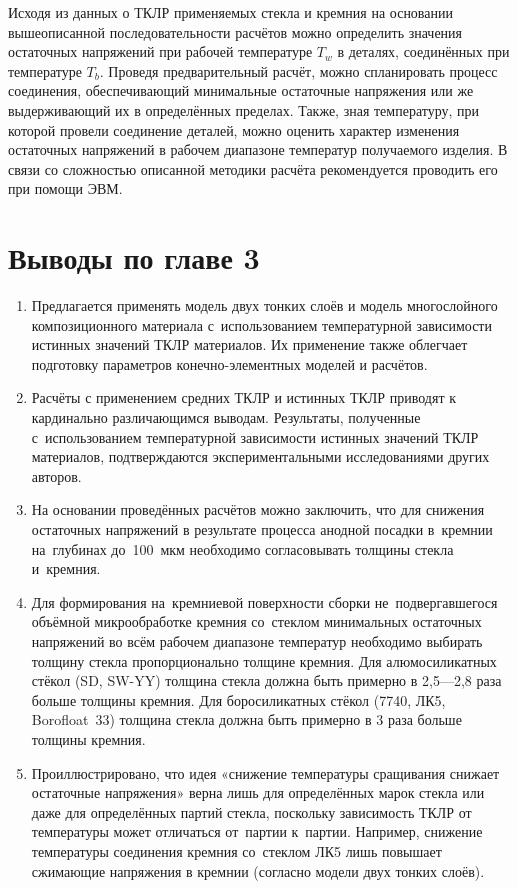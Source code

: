 Исходя из данных о ТКЛР применяемых стекла и кремния на основании вышеописанной последовательности расчётов можно определить значения остаточных напряжений при рабочей температуре $T_w$ в деталях, соединённых при температуре $T_b$.
Проведя предварительный расчёт, можно спланировать процесс соединения, обеспечивающий минимальные остаточные напряжения или же выдерживающий их в определённых пределах.
Также, зная температуру, при которой провели соединение деталей, можно оценить характер изменения остаточных напряжений в рабочем диапазоне температур получаемого изделия.
В связи со сложностью описанной методики расчёта рекомендуется проводить его при помощи ЭВМ.

\section{Выводы по главе 3}
\begin{enumerate}
    \item Предлагается применять модель двух тонких слоёв и модель
    многослойного композиционного материала с~использованием температурной зависимости
    истинных значений
    ТКЛР материалов. Их применение также облегчает
    подготовку параметров конечно-элементных моделей и расчётов.
    \item Расчёты с применением средних ТКЛР и истинных ТКЛР приводят
    к кардинально различающимся выводам. Результаты, полученные с~использованием
    температурной зависимости истинных значений ТКЛР материалов, подтверждаются
    экспериментальными исследованиями других авторов.
     
    \item На основании проведённых расчётов можно заключить, что для
    снижения остаточных напряжений в результате процесса анодной
    посадки в~кремнии на~глубинах до~100~мкм необходимо согласовывать
    толщины стекла и~кремния.
    \item Для формирования на~кремниевой поверхности сборки
    не~подвергавшегося объёмной микрообработке кремния со~стеклом
    минимальных остаточных напряжений во всём рабочем диапазоне
    температур необходимо выбирать толщину стекла пропорционально
    толщине кремния. Для алюмосиликатных стёкол (SD, SW\nb-YY)
    толщина стекла должна быть примерно в 2,5---2,8 раза больше
    толщины кремния. Для боросиликатных стёкол (7740, ЛК5, Borofloat~33)
    толщина стекла должна быть примерно в 3 раза больше толщины
    кремния.
    \item Проиллюстрировано, что идея «снижение температуры
    сращивания снижает остаточные напряжения» верна лишь для определённых марок
    стекла или даже для определённых партий стекла, поскольку зависимость ТКЛР от
    температуры может отличаться от~партии к~партии. Например, снижение температуры
    соединения кремния со~стеклом ЛК5 лишь повышает сжимающие напряжения в кремнии
    (согласно модели двух тонких слоёв).
\end{enumerate}
